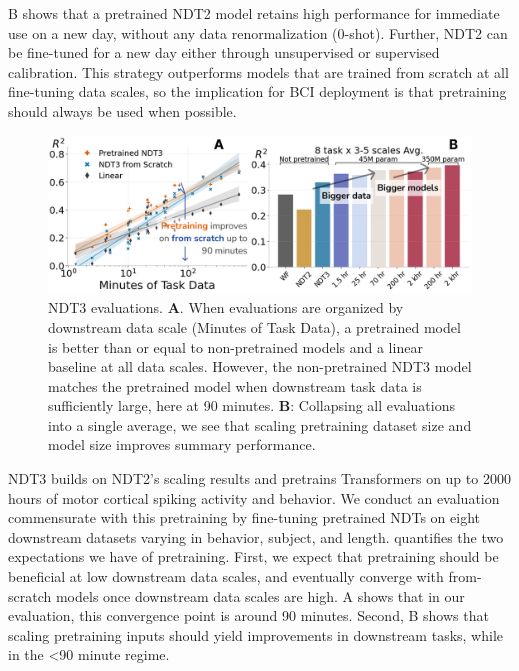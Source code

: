 \documentclass[12pt,oneside]{report}
\begin{document}
B shows that a pretrained NDT2 model retains high performance for immediate use on a new day, without any data renormalization (0-shot). Further, NDT2 can be fine-tuned for a new day either through unsupervised or supervised calibration. This strategy outperforms models that are trained from scratch at all fine-tuning data scales, so the implication for BCI deployment is that pretraining should always be used when possible.

\begin{figure}[h]
  \centering
  \includegraphics[width=0.8\linewidth]{ch2_ndt3_summary.png}
  \caption{NDT3 evaluations. \textbf{A}. When evaluations are organized by downstream data scale (Minutes of Task Data), a pretrained model is better than or equal to non-pretrained models and a linear baseline at all data scales. However, the non-pretrained NDT3 model matches the pretrained model when downstream task data is sufficiently large, here at 90 minutes. \textbf{B}: Collapsing all evaluations into a single average, we see that scaling pretraining dataset size and model size improves summary performance.}
  \label{fig:ndt3_summary}
\end{figure}


NDT3 builds on NDT2’s scaling results and pretrains Transformers on up to 2000 hours of motor cortical spiking activity and behavior. We conduct an evaluation commensurate with this pretraining by fine-tuning pretrained NDTs on eight downstream datasets varying in behavior, subject, and length.  quantifies the two expectations we have of pretraining. First, we expect that pretraining should be beneficial at low downstream data scales, and eventually converge with from-scratch models once downstream data scales are high. A shows that in our evaluation, this convergence point is around 90 minutes. Second, B shows that scaling pretraining inputs should yield improvements in downstream tasks, while in the <90 minute regime.
\end{document}
